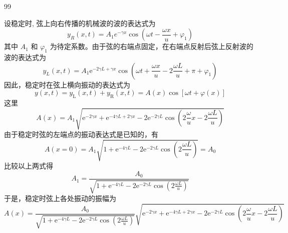 \begin{solution}{99}
    \begin{subsolution}
        \begin{subsubsolution}
            设稳定时, 弦上向右传播的机械波的波的表达式为
            \begin{equation}
                y _ {R} (x, t) = A _ {1} e ^ {- \gamma x} \cos \left(\omega t - \frac {\omega x}{u} + \varphi_ {1}\right)
                \label{eq:1.p99}
            \end{equation}
            其中 $A_{1}$ 和 $\varphi_{1}$ 为待定系数。由于弦的右端点固定，在右端点反射后弦上反射波的波的表达式为
            \begin{equation}
                y _ {L} (x, t) = A _ {1} \mathrm{e} ^ {- 2 \gamma L + \gamma x} \cos \left(\omega t + \frac {\omega x}{u} - 2 \frac {\omega L}{u} + \pi + \varphi_ {1}\right)
                \label{eq:2.p99}
            \end{equation}
            因此，稳定时在弦上横向振动的表达式为
            \begin{equation*}
                y (x, t) = y _ {\mathrm{L}} (x, t) + y _ {\mathrm{R}} (x, t) = A (x) \cos [ \omega t + \varphi (x) ]
            \end{equation*}
            这里
            \begin{equation}
                A (x) = A _ {1} \sqrt {\mathrm{e} ^ {- 2 \gamma x} + \mathrm{e} ^ {- 4 \gamma L + 2 \gamma x} - 2 \mathrm{e} ^ {- 2 \gamma L} \cos \left(2 \frac {\omega}{u} x - 2 \frac {\omega L}{u}\right)}
                \label{eq:3.p99}
            \end{equation}
            由于稳定时弦的左端点的振动表达式是已知的，有
            \begin{equation*}
                A (x = 0) = A _ {1} \sqrt {1 + \mathrm{e} ^ {- 4 \gamma L} - 2 \mathrm{e} ^ {- 2 \gamma L} \cos \left(2 \frac {\omega L}{u}\right)} = A _ {0}
            \end{equation*}
            比较以上两式得
            \begin{equation}
                A _ {1} = \frac {A _ {0}}{\sqrt {1 + \mathrm{e} ^ {- 4 \gamma L} - 2 \mathrm{e} ^ {- 2 \gamma L} \cos \left(2 \frac {\omega L}{u}\right)}}
                \label{eq:4.p99}
            \end{equation}
            于是，稳定时弦上各处振动的振幅为
            \begin{equation}
                A (x) = \frac {A _ {0}}{\sqrt {1 + \mathrm{e} ^ {- 4 \gamma L} - 2 \mathrm{e} ^ {- 2 \gamma L} \cos \left(2 \frac {\omega L}{u}\right)}} \sqrt {\mathrm{e} ^ {- 2 \gamma x} + \mathrm{e} ^ {- 4 \gamma L + 2 \gamma x} - 2 \mathrm{e} ^ {- 2 \gamma L} \cos \left(2 \frac {\omega}{u} x - 2 \frac {\omega L}{u}\right)}

\end{equation}
\end{subsubsolution}
\end{subsolution}
\end{solution}
